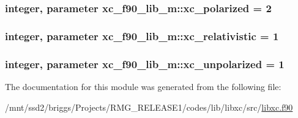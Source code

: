 \hypertarget{classxc__f90__lib__m_abbb2ce70bddd6f2224beeb1177b9a107}{
\subsubsection[{xc\-\_\-polarized}]{\setlength{\rightskip}{0pt plus 5cm}integer, parameter xc\-\_\-f90\-\_\-lib\-\_\-m\-::xc\-\_\-polarized = 2}}\label{classxc__f90__lib__m_abbb2ce70bddd6f2224beeb1177b9a107}
\hypertarget{classxc__f90__lib__m_a73815eca09904ca3234788474c3b62d0}{
\subsubsection[{xc\-\_\-relativistic}]{\setlength{\rightskip}{0pt plus 5cm}integer, parameter xc\-\_\-f90\-\_\-lib\-\_\-m\-::xc\-\_\-relativistic = 1}}\label{classxc__f90__lib__m_a73815eca09904ca3234788474c3b62d0}
\hypertarget{classxc__f90__lib__m_a3badde9a49d8b0af1a2d905e74b66ddd}{
\subsubsection[{xc\-\_\-unpolarized}]{\setlength{\rightskip}{0pt plus 5cm}integer, parameter xc\-\_\-f90\-\_\-lib\-\_\-m\-::xc\-\_\-unpolarized = 1}}\label{classxc__f90__lib__m_a3badde9a49d8b0af1a2d905e74b66ddd}


The documentation for this module was generated from the following file\-:\begin{DoxyCompactItemize}
\item 
/mnt/ssd2/briggs/\-Projects/\-R\-M\-G\-\_\-\-R\-E\-L\-E\-A\-S\-E1/codes/lib/libxc/src/\hyperlink{libxc_8f90}{libxc.\-f90}\end{DoxyCompactItemize}
